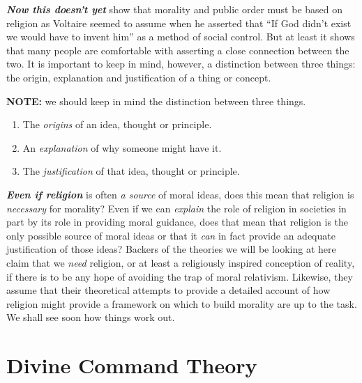 \documentclass[
  12pt, openany]{book}
\makeatletter
\providecommand{\tightlist}{%
  \setlength{\itemsep}{0pt}\setlength{\parskip}{0pt}}
\newenvironment{kframe}{%
\medskip{}
\setlength{\fboxsep}{.8em}
 \def\at@end@of@kframe{}%
 \ifinner\ifhmode%
  \def\at@end@of@kframe{\end{minipage}}%
  \begin{minipage}{\columnwidth}%
 \fi\fi%
 \def\FrameCommand##1{\hskip\@totalleftmargin \hskip-\fboxsep
 \colorbox{shadecolor}{##1}\hskip-\fboxsep
     \hskip-\linewidth \hskip-\@totalleftmargin \hskip\columnwidth}%
 \MakeFramed {\advance\hsize-\width
   \@totalleftmargin\z@ \linewidth\hsize
   \@setminipage}}%
 {\par\unskip\endMakeFramed%
 \at@end@of@kframe}
\newenvironment{rmdblock}[1]
  {
  \begin{itemize}
  \renewcommand{\labelitemi}{
    \raisebox{-.7\height}[0pt][0pt]{
      {\setkeys{Gin}{width=3em,keepaspectratio}\texttt{[image: img/\#1]}}
    }
  }
  \setlength{\fboxsep}{1em}
  \begin{kframe}
  \item
  }
  {
  \end{kframe}
  \end{itemize}
  }
\newenvironment{note}
  {\begin{rmdblock}{note}}
  {\end{rmdblock}}
\theoremstyle{definition}
\theoremstyle{definition}
\theoremstyle{definition}
\theoremstyle{remark}
\makeatother
\begin{document}
\textbf{\emph{Now this doesn't yet}} show that morality and public order must be based on religion as Voltaire seemed to assume when he asserted that ``If God didn't exist we would have to invent him'' as a method of social control. But at least it shows that many people are comfortable with asserting a close connection between the two. It is important to keep in mind, however, a distinction between three things: the origin, explanation and justification of a thing or concept.

\begin{note}

\textbf{NOTE:} we should keep in mind the distinction between three things.

\begin{enumerate}
\def\labelenumi{\arabic{enumi}.}
\tightlist
\item
  The \emph{origins} of an idea, thought or principle.
\item
  An \emph{explanation} of why someone might have it.
\item
  The \emph{justification} of that idea, thought or principle.
\end{enumerate}

\end{note}

\textbf{\emph{Even if religion}} is often \emph{a source} of moral ideas, does this mean that religion is \emph{necessary} for morality? Even if we can \emph{explain} the role of religion in societies in part by its role in providing moral guidance, does that mean that religion is the only possible source of moral ideas or that it \emph{can} in fact provide an adequate justification of those ideas? Backers of the theories we will be looking at here claim that we \emph{need} religion, or at least a religiously inspired conception of reality, if there is to be any hope of avoiding the trap of moral relativism. Likewise, they assume that their theoretical attempts to provide a detailed account of how religion might provide a framework on which to build morality are up to the task. We shall see soon how things work out.

\hypertarget{divine-command-theory}{%
\section{Divine Command Theory}\label{divine-command-theory}}
\end{document}
